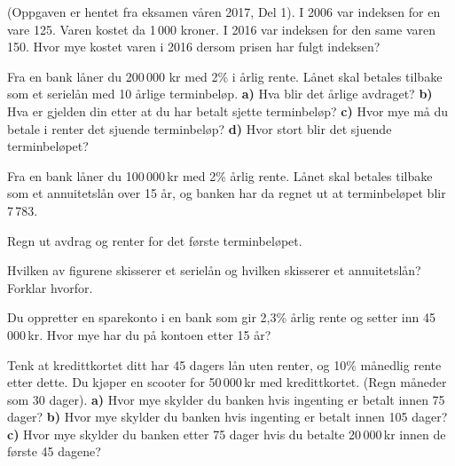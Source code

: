 (Oppgaven er hentet fra eksamen våren 2017, Del 1).\os
I 2006 var indeksen for en vare 125. Varen kostet da 1\,000 kroner. I 2016 var indeksen for den same varen 150.
Hvor mye kostet varen i 2016 dersom prisen har fulgt indeksen?

\nes

Fra en bank låner du 200\,000 kr med 2\% i årlig rente. Lånet skal betales tilbake som et serielån med 10 årlige terminbeløp. \os
\textbf{a)} Hva blir det årlige avdraget?\os
\textbf{b)} Hva er gjelden din etter at du har betalt sjette terminbeløp?\os
\textbf{c)} Hvor mye må du betale i renter det sjuende terminbeløp?\os
\textbf{d)} Hvor stort blir det sjuende terminbeløpet?\os 

Fra en bank låner du 100\,000\,kr med 2\% årlig rente. Lånet skal betales tilbake som et annuitetslån over 15 år, og banken har da regnet ut at terminbeløpet blir 7\,783.\os

Regn ut avdrag og renter for det første terminbeløpet.

Hvilken av figurene skisserer et serielån og hvilken skisserer et annuitetslån? Forklar hvorfor.
\begin{figure}	\centering
	\;
\end{figure}

Du oppretter en sparekonto i en bank som gir 2,3\% årlig rente og setter inn 45\,000\,kr. Hvor mye har du på kontoen etter 15 år?

Tenk at kredittkortet ditt har 45 dagers lån uten renter, og 10\% månedlig rente etter dette. Du kjøper en scooter for 50\,000\,kr med kredittkortet. (Regn måneder som 30 dager).\os
\textbf{a)} Hvor mye skylder du banken hvis ingenting er betalt innen 75 dager?\os
\textbf{b)} Hvor mye skylder du banken hvis ingenting er betalt innen 105 dager?\os 
\textbf{c)} Hvor mye skylder du banken etter 75 dager hvis du betalte 20\,000\,kr innen de første 45 dagene?

